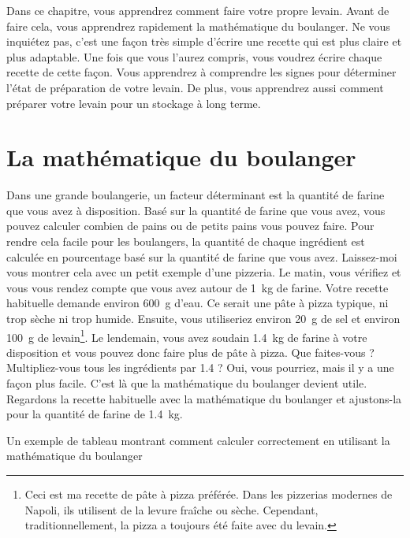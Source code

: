 \begin{quoting}
Dans ce chapitre, vous apprendrez comment faire
votre propre levain. Avant de faire cela, vous apprendrez
rapidement la mathématique du boulanger. Ne vous inquiétez pas,
c'est une façon très simple d'écrire une recette qui
est plus claire et plus adaptable. Une fois que vous l'aurez
compris, vous voudrez écrire chaque recette de cette façon.
Vous apprendrez à comprendre les signes pour déterminer
l'état de préparation de votre levain. De plus, vous
apprendrez aussi comment préparer votre levain pour un stockage à long terme.
\end{quoting}

\section{La mathématique du boulanger}%
\label{section:bakers-math}

Dans une grande boulangerie, un facteur déterminant est la
quantité de farine que vous avez à disposition. Basé sur la quantité
de farine que vous avez, vous pouvez calculer combien
de pains ou de petits pains vous pouvez faire. Pour rendre cela facile
pour les boulangers, la quantité de chaque ingrédient
est calculée en pourcentage basé sur la quantité de farine que vous avez.
Laissez-moi vous montrer cela avec un petit exemple d'une
pizzeria. Le matin, vous vérifiez et vous vous rendez compte que
vous avez autour de \qty{1}{\kg} de farine.
Votre recette habituelle demande environ \qty{600}{\gram} d'eau.
Ce serait une pâte à pizza typique, ni trop sèche ni
trop humide. Ensuite, vous utiliseriez environ \qty{20}{\gram}
de sel et environ \qty{100}{\gram} de levain\footnote{Ceci est ma recette de
pâte à pizza préférée. Dans les pizzerias modernes de Napoli, ils utilisent de la levure fraîche ou sèche.
Cependant, traditionnellement, la pizza a toujours été faite avec du levain.}.
Le lendemain, vous avez soudain \qty{1.4}{\kg} de farine
à votre disposition et vous pouvez donc faire plus de pâte à pizza. Que faites-vous ?
Multipliez-vous tous les ingrédients par 1.4 ? Oui, vous pourriez,
mais il y a une façon plus facile. C'est là que la mathématique du boulanger
devient utile. Regardons la recette habituelle avec la mathématique du boulanger
et ajustons-la pour la quantité de farine de \qty{1.4}{\kg}.

\begin{table}[!htb]
\begin{center}
  
  \caption[Exemple de la mathématique du boulanger]{Un exemple de tableau montrant comment
      calculer correctement en utilisant la mathématique du boulanger}
\end{center}
\end{table}

